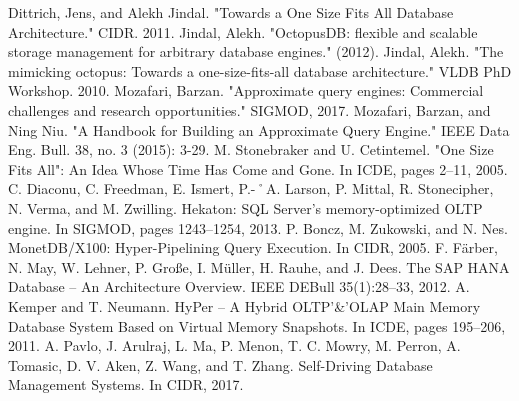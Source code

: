 \documentclass[10pt, conference, compsocconf]{IEEEtran}
\begin{document}
\begin{thebibliography}{1}

Dittrich, Jens, and Alekh Jindal. "Towards a One Size Fits All Database Architecture." CIDR. 2011.
Jindal, Alekh. "OctopusDB: flexible and scalable storage management for arbitrary database engines." (2012).
Jindal, Alekh. "The mimicking octopus: Towards a one-size-fits-all database architecture." VLDB PhD Workshop. 2010.
Mozafari, Barzan. "Approximate query engines: Commercial challenges and research opportunities." SIGMOD, 2017.
Mozafari, Barzan, and Ning Niu. "A Handbook for Building an Approximate Query Engine." IEEE Data Eng.
Bull. 38, no. 3 (2015): 3-29.
M. Stonebraker and U. Cetintemel. "One Size Fits All": An Idea Whose Time Has Come and Gone. In ICDE, pages 2–11, 2005.
C. Diaconu, C. Freedman, E. Ismert, P.-˚A. Larson, P. Mittal, R. Stonecipher, N. Verma, and M. Zwilling. Hekaton: SQL Server’s memory-optimized OLTP engine. In SIGMOD, pages 1243–1254, 2013.
P. Boncz, M. Zukowski, and N. Nes. MonetDB/X100: Hyper-Pipelining Query Execution. In CIDR, 2005.
F. Färber, N. May, W. Lehner, P. Große, I. Müller, H. Rauhe, and J. Dees. The SAP HANA Database – An Architecture Overview. IEEE DEBull 35(1):28–33, 2012.
A. Kemper and T. Neumann. HyPer – A Hybrid OLTP'\&'OLAP Main Memory Database System Based on Virtual Memory Snapshots. In ICDE, pages 195–206, 2011.
A. Pavlo, J. Arulraj, L. Ma, P. Menon, T. C. Mowry, M. Perron, A. Tomasic, D. V. Aken, Z. Wang, and T. Zhang. Self-Driving Database Management Systems. In CIDR, 2017.
\end{thebibliography}
\end{document}
